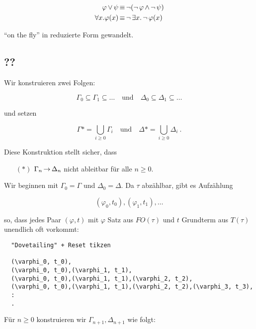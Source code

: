 \begin{align*}
  \varphi \operatorname{\vee} \psi &\operatorname{\equiv} \operatorname{\neg}(\operatorname{\neg}\varphi \operatorname{\wedge} \operatorname{\neg}\psi) \\
  \forall x.\varphi(x) &\operatorname{\equiv} \operatorname{\neg}\exists x.\operatorname{\neg}\varphi(x)
\end{align*}

\enquote{on the fly} in reduzierte Form gewandelt.

\subsection{??}

Wir konstruieren zwei Folgen:

\[ \Gamma_0 \subseteq \Gamma_1 \subseteq \dots \quad \text{und} \quad \Delta_0 \subseteq \Delta_1 \subseteq \dots \]

und setzen

\[ \Gamma* = \bigcup_{i\geq 0} \Gamma_i \quad \text{und} \quad \Delta* = \bigcup_{i\geq 0} \Delta_i\ \text{.} \]

Diese Konstruktion stellt sicher, dass

\begin{itemize}
  \item[$(*)$] $\Gamma_n \operatorname{\rightarrow} \Delta_n$ nicht ableitbar für alle $n\geq 0$.
\end{itemize}

Wir beginnen mit $\Gamma_0=\Gamma$ und $\Delta_0=\Delta$. Da $\tau$
abzählbar, gibt es Aufzählung

\[
  (\varphi_0, t_0), (\varphi_1, t_1), \dots
\]

so, dass jedes Paar $(\varphi,t)$ mit $\varphi$ Satz aus $FO(\tau)$ und $t$ Grundterm
aus $T(\tau)$ unendlich oft vorkommt:

\begin{verbatim}
  "Dovetailing" + Reset tikzen
  
  (\varphi_0, t_0),
  (\varphi_0, t_0),(\varphi_1, t_1),
  (\varphi_0, t_0),(\varphi_1, t_1),(\varphi_2, t_2),
  (\varphi_0, t_0),(\varphi_1, t_1),(\varphi_2, t_2),(\varphi_3, t_3),
  :
  .
\end{verbatim}

Für $n\geq 0$ konstruieren wir $\Gamma_{n+1}, \Delta_{n+1}$ wie folgt:


